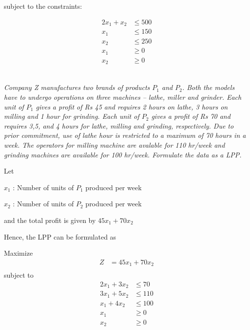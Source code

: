 \documentclass[12pt]{article}
\begin{document}
subject to the constraints:

\begin{align*}
2 x_1 + x_2 & \le 500 \\
x_1         & \le 150 \\
x_2         & \le 250 \\
x_1         & \ge 0   \\
x_2         & \ge 0   \\
\end{align*}
\subsection{}

\emph{Company Z manufactures two brands of products $P_1$ and $P_2$. Both the models have to undergo operations on three machines -- lathe, miller and grinder. Each unit of $P_1$ gives a profit of Rs 45 and requires 2 hours on lathe, 3 hours on milling and 1 hour for grinding. Each unit of $P_2$ gives a profit of Rs 70 and requires 3,5, and 4 hours for lathe, milling and grinding, respectively. Due to prior commitment, use of lathe hour is restricted to a maximum of 70 hours in a week. The operators for milling machine are avalable for 110 hr/week and grinding machines are available for 100 hr/week. Formulate the data as a LPP.}

Let 

$x_1$ : Number of units of $P_1$ produced per week

$x_2$ : Number of units of $P_2$ produced per week

and the total profit is given by $45x_1 + 70x_2$

Hence, the LPP can be formulated as 

Maximize
\begin{align*}
Z         & = 45x_1 + 70x_2 \\
\end{align*}
subject to
\begin{align*}
2x_1+3x_2 & \le 70          \\
3x_1+5x_2 & \le 110         \\
x_1+4x_2  & \le 100         \\
x_1       & \ge 0           \\
x_2       & \ge 0           \\
\end{align*}
\subsection{}
\end{document}
